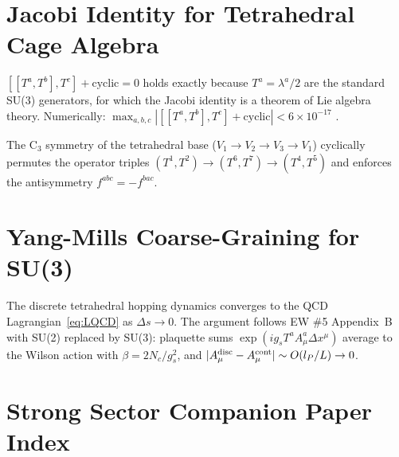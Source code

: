 \documentclass[11pt,a4paper]{article}
\newcommand{\lP}{l_P}
\begin{document}
\appendix

\section{Jacobi Identity for Tetrahedral Cage Algebra}
\label{app:jacobi}

$[[T^a,T^b],T^c]+\text{cyclic}=0$ holds exactly because $T^a =
\lambda^a/2$ are the standard SU(3) generators, for which the Jacobi
identity is a theorem of Lie algebra theory.  Numerically:
$\max_{a,b,c}|[[T^a,T^b],T^c]+\text{cyclic}| < 6\times10^{-17}$
\citep{cpp_ss_mc}.

The C$_3$ symmetry of the tetrahedral base ($V_1\to V_2\to V_3\to
V_1$) cyclically permutes the operator triples
$(T^1,T^2)\to(T^6,T^7)\to(T^4,T^5)$ and enforces the
antisymmetry $f^{abc} = -f^{bac}$.

\section{Yang-Mills Coarse-Graining for SU(3)}
\label{app:coarse}

The discrete tetrahedral hopping dynamics converges to the QCD
Lagrangian~\eqref{eq:LQCD} as $\Delta s\to 0$.  The argument
follows EW \#5 Appendix~B~\citep{cpp_ew5} with SU(2) replaced
by SU(3): plaquette sums $\exp(ig_s T^a A^a_\mu\Delta x^\mu)$
average to the Wilson action with $\beta = 2N_c/g_s^2$, and
$|A_\mu^{\rm disc} - A_\mu^{\rm cont}|\sim O(\lP/L)\to0$.

\section{Strong Sector Companion Paper Index}
\label{app:index}
\end{document}
